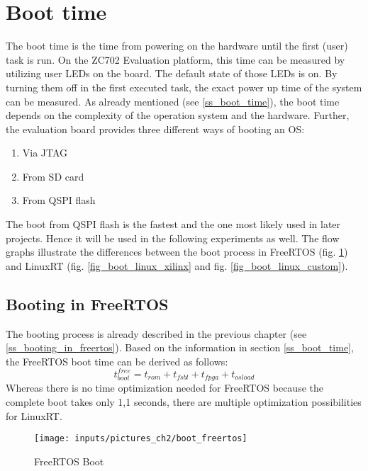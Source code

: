 \section{Boot time}\label{s_boot_time}
The boot time is the time from powering on the hardware until the first (user) task is run. 
On the ZC702 Evaluation platform, this time can be measured by utilizing user \acp{LED} on the board.  
The default state of those \acp{LED} is on.
By turning them off in the first executed task, the exact power up time of the system can be measured.  
As already mentioned (see \ref{ss_boot_time}), the boot time depends on the complexity of the operation system and the hardware. 
Further, the evaluation board provides three different ways of booting an \ac{OS}:
\begin{enumerate}
	\item Via \ac{JTAG}
	\item From \ac{SD} card
	\item From \ac{QSPI} flash
\end{enumerate}
The boot from \ac{QSPI} flash is the fastest and the one most likely used in later projects.
Hence it will be used in the following experiments as well.
The flow graphs illustrate the differences between the boot process in FreeRTOS (fig. \ref{fig_boot_freertos}) and LinuxRT (fig. \ref{fig_boot_linux_xilinx} and fig. \ref{fig_boot_linux_custom}).

\subsection{Booting in FreeRTOS}
The booting process is already described in the previous chapter (see \ref{ss_booting_in_freertos}).
Based on the information in section \ref{ss_boot_time}, the FreeRTOS boot time can be derived as follows:
	\begin{equation}
		t_{boot}^{free} = t_{rom} + t_{fsbl} +  t_{fpga} + t_{osload} \label{eq_t_boot_free} 
	\end{equation}
Whereas there is no time optimization needed for FreeRTOS because the complete boot takes only 1,1 seconds, there are multiple optimization possibilities for LinuxRT. 

\begin{figure}[htb]
		\begin{center}
			\texttt{[image: inputs/pictures\_ch2/boot\_freertos]}
			\caption[FreeRTOS boot]{FreeRTOS Boot \cite{xilinx:zbff}} \label{fig_boot_freertos}
		\end{center}
\end{figure} 

